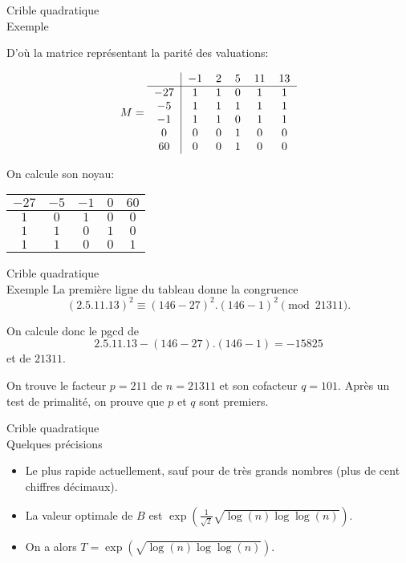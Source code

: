 \documentclass[utf8,10pt,french]{beamer}
\begin{document}
\begin{frame}{Crible quadratique \\ Exemple}
  
D'où la matrice représentant la parité des valuations:

\[ M =
\begin{tabular}{c|ccccc}
  & $-1$ & $2$ & $5$ & $11$ & $13$\\
  \hline
  $-27$ & $1$ & $1$ & $0$ & $1$ & $1$\\
  $ -5$ & $1$ & $1$ & $1$ & $1$ & $1$\\
  $-1$ & $1$ & $1$ & $0$ & $1$ & $1$\\
  $0$ & $0$ & $0$ & $1$ & $0$ & $0$\\
  $60$ & $0$ & $0$ & $1$ & $0$ & $0$\\
\end{tabular}
\]

On calcule son noyau:

\begin{center}
  \begin{tabular}{ccccc}
    $-27$ & $-5$ & $-1$ & $0$ & $60$\\
    \hline
    $1$ & $0$ & $1$ & $0$ & $0$\\
    $1$ & $1$ & $0$ & $1$ & $0$\\
    $1$ & $1$ & $0$ & $0$ & $1$\\
  \end{tabular}
\end{center}
\end{frame}
\begin{frame}{Crible quadratique \\ Exemple}
La première ligne du tableau donne la congruence \[ (2.5.11.13)^2 \equiv (146 - 27)^2.(146 - 1)^2 \pmod{21311} .\]

On calcule donc le pgcd de \[ 2.5.11.13 - (146 - 27).(146 - 1) = -15825 \] et de $21311.$

On trouve le facteur $p = 211$ de $n = 21311$ et son cofacteur $q = 101.$
Après un test de primalité, on prouve que $p$ et $q$ sont premiers.
\end{frame}

\begin{frame}{Crible quadratique \\ Quelques précisions}
\begin{itemize}
\item Le plus rapide actuellement, sauf pour de très grands nombres (plus de cent chiffres décimaux). \pause
\item La valeur optimale de $B$ est $\exp \left( \frac{1}{\sqrt{2}} \sqrt{\log(n)\log\log(n)} \right).$ \pause
\item On a alors $T = \exp\left(\sqrt{\log (n) \log \log (n)}\right).$
\end{itemize}
\end{frame}
\end{document}
